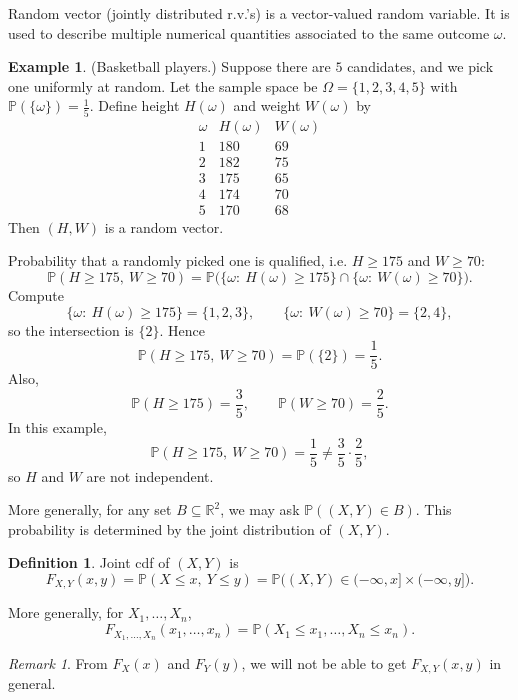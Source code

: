 \documentclass[11pt]{article}
\theoremstyle{plain}
\theoremstyle{definition}
\newtheorem{definition}[theorem]{Definition}
\newtheorem{example}[theorem]{Example}
\theoremstyle{remark}
\newtheorem{remark}[theorem]{Remark}
\begin{document}
	Random vector (jointly distributed r.v.'s) is a vector-valued random variable.
	It is used to describe multiple numerical quantities associated to the same outcome \(\omega\).
	
	\begin{example}
		(Basketball players.)
		Suppose there are \(5\) candidates, and we pick one uniformly at random.
		Let the sample space be \(\Omega=\{1,2,3,4,5\}\) with \(\mathbb{P}(\{\omega\})=\frac{1}{5}\).
		Define height \(H(\omega)\) and weight \(W(\omega)\) by
		\[
		\begin{array}{c|cc}
			\omega & H(\omega) & W(\omega)\\\hline
			1 & 180 & 69\\
			2 & 182 & 75\\
			3 & 175 & 65\\
			4 & 174 & 70\\
			5 & 170 & 68
		\end{array}
		\]
		Then \((H,W)\) is a random vector.
		
		Probability that a randomly picked one is qualified, i.e. \(H\ge 175\) and \(W\ge 70\):
		\[
		\mathbb{P}(H\ge 175,\ W\ge 70)
		=\mathbb{P}\big(\{\omega:\ H(\omega)\ge 175\}\cap\{\omega:\ W(\omega)\ge 70\}\big).
		\]
		Compute
		\[
		\{\omega:\ H(\omega)\ge 175\}=\{1,2,3\},
		\qquad
		\{\omega:\ W(\omega)\ge 70\}=\{2,4\},
		\]
		so the intersection is \(\{2\}\). Hence
		\[
		\mathbb{P}(H\ge 175,\ W\ge 70)=\mathbb{P}(\{2\})=\frac{1}{5}.
		\]
		Also,
		\[
		\mathbb{P}(H\ge 175)=\frac{3}{5},\qquad
		\mathbb{P}(W\ge 70)=\frac{2}{5}.
		\]
		In this example,
		\[
		\mathbb{P}(H\ge 175,\ W\ge 70)=\frac{1}{5}\ne \frac{3}{5}\cdot\frac{2}{5},
		\]
		so \(H\) and \(W\) are not independent.
	\end{example}
	
	More generally, for any set \(B\subseteq \mathbb{R}^2\), we may ask \(\mathbb{P}((X,Y)\in B)\).
	This probability is determined by the joint distribution of \((X,Y)\).
	
	\begin{definition}
		Joint cdf of \((X,Y)\) is
		\[
		F_{X,Y}(x,y)=\mathbb{P}(X\le x,\ Y\le y)
		=\mathbb{P}\big((X,Y)\in (-\infty,x]\times(-\infty,y]\big).
		\]
	\end{definition}
	
	More generally, for \(X_1,\dots,X_n\),
	\[
	F_{X_1,\dots,X_n}(x_1,\dots,x_n)
	=\mathbb{P}(X_1\le x_1,\dots, X_n\le x_n).
	\]
	
	\begin{remark}
		From \(F_X(x)\) and \(F_Y(y)\), we will not be able to get \(F_{X,Y}(x,y)\) in general.
	\end{remark}
	
\end{document}
